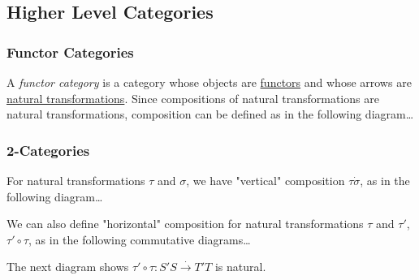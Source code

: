 \subsection{Higher Level Categories}\label{higherlevelcategories}

\subsubsection{Functor Categories}\label{functorcategories}

A \emph{functor category} is a category whose objects are \hyperref[functor]{functors} and whose arrows are \hyperref[naturaltransformations]{natural transformations}.
Since compositions of natural transformations are natural transformations, composition can be defined as in the following diagram\dots

\begin{figure}[H]
  \centering
  
\end{figure}

\subsubsection{2-Categories}

\label{verticalcomposition}
For natural transformations $\tau$ and $\sigma$, we have "vertical" composition $\tau \dot \sigma$, as in the following diagram\dots

\begin{figure}[H]
  \centering
  
\end{figure}

\label{horizontalcomposition}
We can also define "horizontal" composition for natural transformations $\tau$ and $\tau'$, $\tau' \circ \tau$, as in the following commutative diagrams\dots

\begin{figure}[H]
  \centering
  
\end{figure}

\begin{figure}[H]
  \centering
  
\end{figure}

\noindent The next diagram shows $\tau' \circ \tau : S'S \xrightarrow[]{\cdot} T'T$ is natural.

